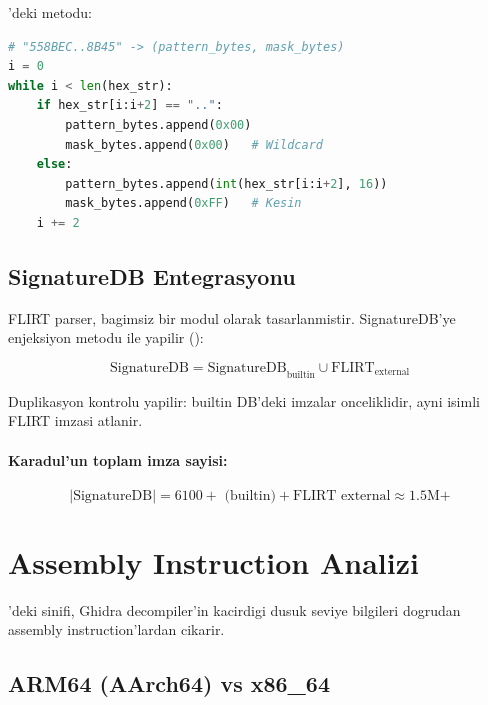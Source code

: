 'deki  metodu:

\begin{lstlisting}[language=Python, caption={Hex string ile mask olusturma}]
# "558BEC..8B45" -> (pattern_bytes, mask_bytes)
i = 0
while i < len(hex_str):
    if hex_str[i:i+2] == "..":
        pattern_bytes.append(0x00)
        mask_bytes.append(0x00)   # Wildcard
    else:
        pattern_bytes.append(int(hex_str[i:i+2], 16))
        mask_bytes.append(0xFF)   # Kesin
    i += 2
\end{lstlisting}

\subsection{SignatureDB Entegrasyonu}

FLIRT parser, bagimsiz bir modul olarak tasarlanmistir. SignatureDB'ye enjeksiyon  metodu ile yapilir ():

\begin{equation}
\label{eq:flirt-inject}
\text{SignatureDB} = \text{SignatureDB}_{\text{builtin}} \cup \text{FLIRT}_{\text{external}}
\end{equation}

Duplikasyon kontrolu yapilir: builtin DB'deki imzalar onceliklidir, ayni isimli FLIRT imzasi atlanir.

\paragraph{Karadul'un toplam imza sayisi:}
\begin{equation}
|\text{SignatureDB}| = 6100+ \text{ (builtin)} + \text{FLIRT external} \approx 1.5\text{M+}
\end{equation}


\section{Assembly Instruction Analizi}
\label{sec:assembly-analysis}

'deki  sinifi, Ghidra decompiler'in kacirdigi dusuk seviye bilgileri dogrudan assembly instruction'lardan cikarir.

\subsection{ARM64 (AArch64) vs x86\_64}

